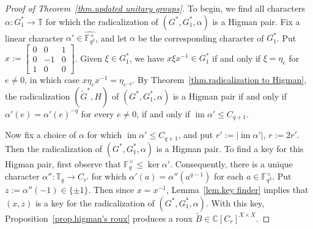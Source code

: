\begin{proof}[Proof of Theorem~\ref{thm.updated unitary groups}]
To begin, we find all characters $\alpha \colon G_1^* \to \mathbb{T}$ for which the radicalization of $(G^*, G_1^*, \alpha)$ is a Higman pair.
Fix a linear character $\alpha' \in \widehat{ \mathbb{F}_{q^2}^\times }$, and let $\alpha$ be the corresponding character of $G_1^*$.
Put $x := \begin{bmatrix} 0 & 0 & 1 \\ 0 & -1 & 0 \\ 1 & 0 & 0 \end{bmatrix}$.
Given $\xi \in G_1^*$, we have $x \xi x^{-1} \in G_1^*$ if and only if $\xi = \eta_e$ for $e \neq 0$, in which case $x \eta_e x^{-1} = \eta_{e^{-q}}$.
By Theorem~\ref{thm.radicalization to Higman}, the radicalization $(\widetilde{G}^*,H)$ of $(G^*, G_1^*, \alpha)$ is a Higman pair if and only if $\alpha'(e) = \alpha'(e)^{-q}$ for every $e \neq 0$, if and only if $\operatorname{im} \alpha' \leq C_{q+1}$.

Now fix a choice of $\alpha$ for which $\operatorname{im}\alpha'\leq C_{q+1}$, and put $r':=|\operatorname{im}\alpha'|$, $r:=2r'$.
Then the radicalization of $(G^*,G_1^*,\alpha)$ is a Higman pair.
To find a key for this Higman pair, first observe that $\mathbb{F}_q^\times \leq \operatorname{ker}\alpha'$.
Consequently, there is a unique character $\alpha''\colon\mathbb{T}_q\to C_{r'}$ for which $\alpha'(a)=\alpha''(a^{q-1})$ for each $a\in\mathbb{F}_{q^2}^\times$.
Put $z:=\alpha''(-1)\in\{\pm1\}$.
Then since $x=x^{-1}$, Lemma~\ref{lem.key finder} implies that $(x,z)$ is a key for the radicalization of $(G^*,G_1^*,\alpha)$.
With this key, Proposition~\ref{prop.higman's roux} produces a roux $\tilde{B}\in\mathbb{C}[C_r]^{X\times X}$.


\end{proof}
